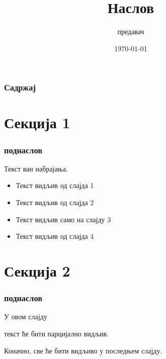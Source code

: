 \documentclass[aspectratio=169]{beamer}
\title{Наслов}
\author{предавач}
\date{\today}
\begin{document}
\frame{\titlepage}

\begin{frame}
    \frametitle{Садржај}
    \tableofcontents
\end{frame}

\section{Секција 1}

\begin{frame}
    \frametitle{поднаслов}

    Текст ван набрајања.

    \begin{itemize}
        \item<1-> Текст видљив од слајда 1
        \item<2-> Текст видљив од слајда 2
        \item<3> Текст видљив само на слајду 3
        \item<4-> Текст видљив од слајда 4
    \end{itemize}
\end{frame}

\section{Секција 2}

\begin{frame}
    \frametitle{поднаслов}

    У овом слајду \pause

    текст ће бити парцијално видљив. \pause

    Коначно, све ће бити видљиво у последњем слајду.
\end{frame}
\end{document}

